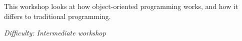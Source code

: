 %
%
%



\newcommand{\workshopTitle}{Workshop 13: Objects}

\newcommand{\workshopAuthor}{Jack Kelly}



	
	
	This workshop looks at how object-oriented programming works, and how it differs to traditional programming.
	
	\textit{Difficulty: Intermediate workshop}
	
	\setcounter{tocdepth}{1}
	\tableofcontents
	


